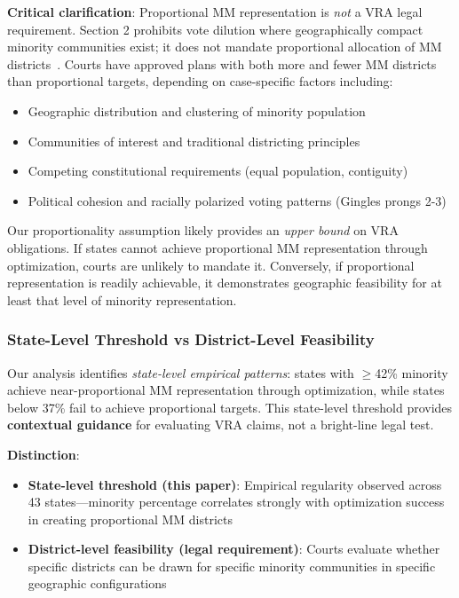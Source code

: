 \textbf{Critical clarification}: Proportional MM representation is \emph{not} a VRA legal requirement. Section 2 prohibits vote dilution where geographically compact minority communities exist; it does not mandate proportional allocation of MM districts~\citep{johnson1996}. Courts have approved plans with both more and fewer MM districts than proportional targets, depending on case-specific factors including:

\begin{itemize}
    \item Geographic distribution and clustering of minority population
    \item Communities of interest and traditional districting principles
    \item Competing constitutional requirements (equal population, contiguity)
    \item Political cohesion and racially polarized voting patterns (Gingles prongs 2-3)
\end{itemize}

Our proportionality assumption likely provides an \emph{upper bound} on VRA obligations. If states cannot achieve proportional MM representation through optimization, courts are unlikely to mandate it. Conversely, if proportional representation is readily achievable, it demonstrates geographic feasibility for at least that level of minority representation.

\subsubsection{State-Level Threshold vs District-Level Feasibility}

Our analysis identifies \emph{state-level empirical patterns}: states with $\geq$42\% minority achieve near-proportional MM representation through optimization, while states below 37\% fail to achieve proportional targets. This state-level threshold provides \textbf{contextual guidance} for evaluating VRA claims, not a bright-line legal test.

\textbf{Distinction}:
\begin{itemize}
    \item \textbf{State-level threshold (this paper)}: Empirical regularity observed across 43 states---minority percentage correlates strongly with optimization success in creating proportional MM districts
    \item \textbf{District-level feasibility (legal requirement)}: Courts evaluate whether specific districts can be drawn for specific minority communities in specific geographic configurations
\end{itemize}

